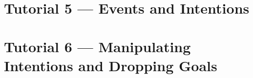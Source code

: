 \section{Tutorial 5 --- Events and Intentions}

{
  \let\section\subsection
  \let\subsection\subsubsection
  \let\subsubsection\paragraph
  
  
  }

\section{Tutorial 6 --- Manipulating Intentions and Dropping Goals}

{
  \let\section\subsection
  \let\subsection\subsubsection
  \let\subsubsection\paragraph
  
  
  }

